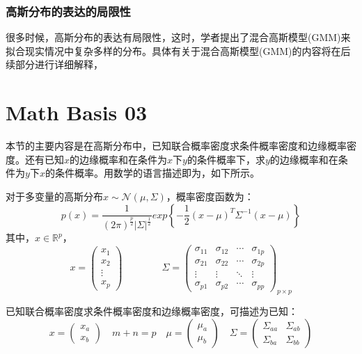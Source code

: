 \documentclass[a4paper]{article}
\numberwithin{equation}{section}
\begin{document}
\subsubsection{高斯分布的表达的局限性}
很多时候，高斯分布的表达有局限性，这时，学者提出了混合高斯模型(GMM)来拟合现实情况中复杂多样的分布。具体有关于混合高斯模型(GMM)的内容将在后续部分进行详细解释，


\section{Math Basis 03 }
本节的主要内容是在高斯分布中，已知联合概率密度求条件概率密度和边缘概率密度。还有已知$x$的边缘概率和在条件为$x$下$y$的条件概率下，求$y$的边缘概率和在条件为$y$下$x$的条件概率。用数学的语言描述即为，如下所示。

对于多变量的高斯分布$x\sim \mathcal{N}(\mu,\Sigma)$，概率密度函数为：
\begin{equation}
    p(x)=\frac{1}{(2\pi)^{\frac{p}{2}}|\Sigma|^{\frac{1}{2}}}exp\left\{ -\frac{1}{2}(x-\mu)^T\Sigma^{-1}(x-\mu) \right\}
\end{equation}
其中，$x\in\mathbb{R}^p$，
\begin{equation}
    x=
    \begin{pmatrix}
        x_1 \\
        x_2 \\
        \vdots \\
        x_p
    \end{pmatrix} \qquad \qquad
    \Sigma = 
    \begin{pmatrix}
        \sigma_{11} & \sigma_{12} & \cdots & \sigma_{1p} \\
        \sigma_{21} & \sigma_{22} & \cdots & \sigma_{2p} \\
        \vdots      & \vdots      & \ddots & \vdots      \\
        \sigma_{p1} & \sigma_{p2} & \cdots & \sigma_{pp}
        \end{pmatrix}_{p\times p}
\end{equation}

已知联合概率密度求条件概率密度和边缘概率密度，可描述为已知：
\begin{equation}
    x= 
    \begin{pmatrix}
        x_a \\
        x_b
    \end{pmatrix}
    \quad m+n=p \quad
    \mu=
    \begin{pmatrix}
        \mu_a \\
        \mu_b
    \end{pmatrix} \quad
    \Sigma=
    \begin{pmatrix}
    \Sigma_{aa} & \Sigma_{ab} \\
    \Sigma_{ba} & \Sigma_{bb} 
    \end{pmatrix}
\end{equation}
\end{document}
